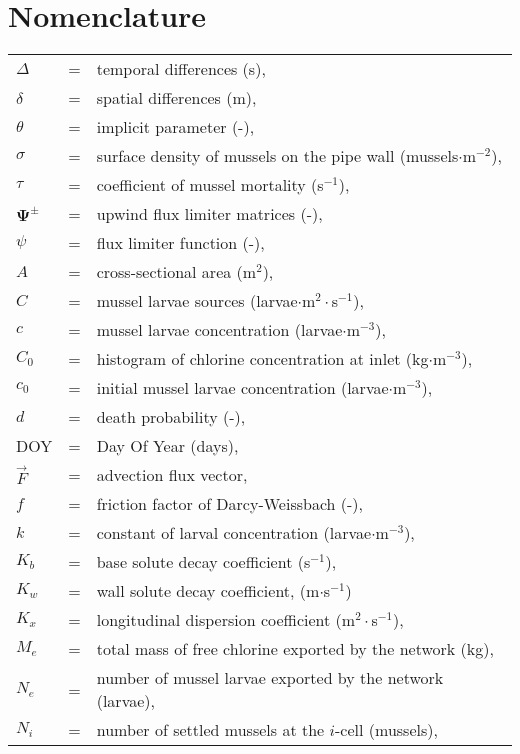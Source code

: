 \documentclass[review,authoryear]{elsarticle}
\begin{document}


\linenumbers

\section*{Nomenclature}

{\scriptsize
\begin{tabular}{lcl}
$\Delta$ & = & temporal differences (s),\\
$\delta$ & = & spatial differences (m),\\
$\theta$ & = & implicit parameter (-),\\
$\sigma$ & = & surface density of mussels on the pipe wall
	(mussels$\cdot$m$^{-2}$),\\
$\tau$ & = & coefficient of mussel mortality (s$^{-1}$),\\
$\mathbf{\Psi}^\pm$ & = & upwind flux limiter matrices (-),\\
$\psi$ & = & flux limiter function (-),\\
$A$ & = & cross-sectional area (m$^2$),\\
$C$ & = & mussel larvae sources (larvae$\cdot$m$^2\cdot$s$^{-1}$),\\
$c$ & = & mussel larvae concentration (larvae$\cdot$m$^{-3}$),\\
$C_0$ & = & histogram of chlorine concentration at inlet (kg$\cdot$m$^{-3}$),\\
$c_0$ & = & initial mussel larvae concentration (larvae$\cdot$m$^{-3}$),\\
$d$ & = & death probability (-),\\
DOY & = & Day Of Year (days),\\
$\vec{F}$ & = & advection flux vector,\\
$f$ & = & friction factor of Darcy-Weissbach (-),\\
$k$ & = & constant of larval concentration (larvae$\cdot$m$^{-3}$),\\
$K_b$ & = & base solute decay coefficient (s$^{-1}$),\\
$K_w$ & = & wall solute decay coefficient, (m$\cdot$s$^{-1}$)\\
$K_x$ & = & longitudinal dispersion coefficient (m$^2\cdot$s$^{-1}$),\\
$M_e$ & = & total mass of free chlorine exported by the network (kg),\\
$N_e$ & = & number of mussel larvae exported by the network (larvae),\\
$N_i$ & = & number of settled mussels at the $i$-cell (mussels),\\

\end{tabular}}
\end{document}
